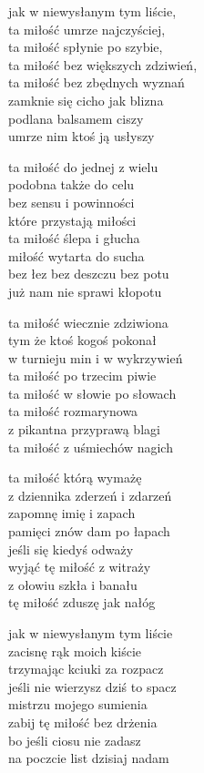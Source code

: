 \begin{text}
    jak w niewysłanym tym liście,\\
    ta miłość umrze najczyściej,\\
    ta miłość spłynie po szybie,\\
    ta miłość bez większych zdziwień,\\
    ta miłość bez zbędnych wyznań\\
    zamknie się cicho jak blizna\\
    podlana balsamem ciszy\\
    umrze nim ktoś ją usłyszy

    ta miłość do jednej z wielu\\
    podobna także do celu\\
    bez sensu i powinności\\
    które przystają miłości\\
    ta miłość ślepa i głucha\\
    miłość wytarta do sucha\\
    bez łez bez deszczu bez potu\\
    już nam nie sprawi kłopotu

    ta miłość wiecznie zdziwiona\\
    tym że ktoś kogoś pokonał\\
    w turnieju min i w wykrzywień\\
    ta miłość po trzecim piwie\\
    ta miłość w słowie po słowach\\
    ta miłość rozmarynowa\\
    z pikantna przyprawą blagi\\
    ta miłość z uśmiechów nagich

    ta miłość którą wymażę\\
    z dziennika zderzeń i zdarzeń\\
    zapomnę imię i zapach\\
    pamięci znów dam po łapach\\
    jeśli się kiedyś odważy\\
    wyjąć tę miłość z witraży\\
    z ołowiu szkła i banału\\
    tę miłość zduszę jak nałóg

    jak w niewysłanym tym liście\\
    zacisnę rąk moich kiście\\
    trzymając kciuki za rozpacz\\
    jeśli nie wierzysz dziś to spacz\\
    mistrzu mojego sumienia\\
    zabij tę miłość bez drżenia\\
    bo jeśli ciosu nie zadasz\\
    na poczcie list dzisiaj nadam
\end{text}
\begin{chord}

\end{chord}